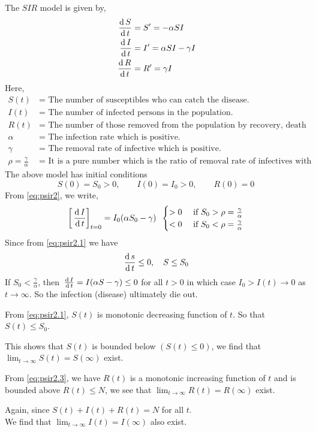 \documentclass[../main-sheet.tex]{subfiles}
\begin{document}
\begin{soln}
    The \(SIR\) model is given by,
    \begin{align}
        \,\frac{\mathrm{d}\,S}{\mathrm{d}\,t}&=S'=-\alpha SI\label{eq:psir2.1}\\
        \,\frac{\mathrm{d}\,I}{\mathrm{d}\,t}&=I'=\alpha SI-\gamma I\label{eq:psir2.2}\\
        \,\frac{\mathrm{d}\,R}{\mathrm{d}\,t}&=R'=\gamma I\label{eq:psir2.3}
    \end{align}
    Here,
    \begin{align*}
        S(t)&=\text{ The number of susceptibles who can catch the disease.}\\
        I(t)&=\text{ The number of infected persons in the population.}\\
        R(t)&=\text{ The number of those removed from the population by recovery, death or by any other means.}\\
        \alpha&=\text{ The infection rate which is positive.}\\
        \gamma&=\text{ The removal rate of infective which is positive.}\\
        \rho=\frac{\gamma}{\alpha}&=\text{ It is a pure number which is the ratio of removal rate of infectives with infection rate.}
    \end{align*}
    The above model has initial conditions
    \begin{equation}
        S(0)=S_0>0,\qquad I(0)=I_0>0,\qquad R(0)=0\label{eq:psir2.4}
    \end{equation}
    From \eqref{eq:psir2}, we write,
    \[
        \left[ \,\frac{\mathrm{d}\,I}{\mathrm{d}\,t} \right]_{t=0}=I_0 (\alpha S_0-\gamma)\;\;\begin{cases}
            >0& \text{ if } S_0>\rho=\frac{\gamma}{\alpha}\\
            <0& \text{ if } S_0<\rho=\frac{\gamma}{\alpha}
        \end{cases}
    \]
    Since from \eqref{eq:psir2.1} we have
    \[
        \,\frac{\mathrm{d}\,s}{\mathrm{d}\,t}\leq 0,\quad S\leq S_0
    \]
    If \(S_0<\frac{\gamma}{\alpha}\), then \(\,\frac{\mathrm{d}\,I}{\mathrm{d}\,t}=I(\alpha S-\gamma)\leq 0 \)
    for all \(t>0\) in which case \(I_0>I(t)\to 0\) as \(t\to \infty\). So the infection (disease) ultimately die out.

    From \eqref{eq:psir2.1}, \(S(t)\) is monotonic decreasing function of \(t\). So that \(S(t)\leq S_0\).

    This shows that \(S(t)\) is bounded below \((S(t)\leq 0)\), we find that \(\lim_{t\to \infty}S(t)=S(\infty)\) exist.

    From \eqref{eq:psir2.3}, we have \(R(t)\) is a monotonic increasing function of \(t\) and is bounded above \(R(t)\leq N\), we see that \(\lim_{t\to \infty}R(t)=R(\infty)\) exist.

    Again, since \(S(t)+I(t)+R(t)=N\) for all \(t\).\\
    We find that \(\lim_{t\to \infty}I(t)=I(\infty)\) also exist.
\end{soln}
\end{document}
